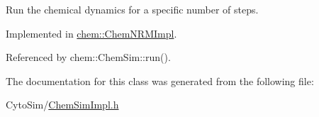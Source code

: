 Run the chemical dynamics for a specific number of steps. 



Implemented in \hyperlink{classchem_1_1ChemNRMImpl_a8ccff6cf244e91b8057c323d17a5b48c}{chem\-::\-Chem\-N\-R\-M\-Impl}.



Referenced by chem\-::\-Chem\-Sim\-::run().



The documentation for this class was generated from the following file\-:\begin{DoxyCompactItemize}
\item 
Cyto\-Sim/\hyperlink{ChemSimImpl_8h}{Chem\-Sim\-Impl.\-h}\end{DoxyCompactItemize}
